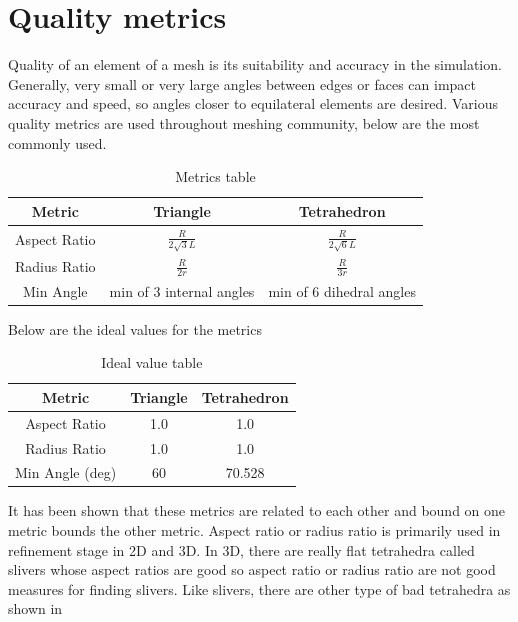 \section{Quality metrics}
Quality of an element of a mesh is its suitability and accuracy in the simulation. Generally, very small or very large angles between edges or faces can impact accuracy and speed, so angles closer to equilateral elements are desired. Various quality metrics are used throughout meshing community, below are the most commonly used.

\begin{table}[ht]
\caption{Metrics table}
\begin{center}
\begin{tabular}{ |c|c|c| } 
\hline
Metric & Triangle & Tetrahedron \\ 
\hline
Aspect Ratio & $\frac{R}{2\sqrt{3}L}$ & $\frac{R}{2\sqrt{6}L}$ \\ 
\hline
Radius Ratio & $\frac{R}{2r}$ & $\frac{R}{3r}$ \\ 
\hline
Min Angle 	 & min of 3 internal angles & min of 6 dihedral angles  \\ 
\hline
\end{tabular}
\end{center}
\end{table}

Below are the ideal values for the metrics

\begin{table}[ht]
\caption{Ideal value table}
\begin{center}
\begin{tabular}{ |c|c|c| } 
\hline
Metric & Triangle & Tetrahedron \\ 
\hline
Aspect Ratio & 1.0 & 1.0 \\ 
\hline
Radius Ratio & 1.0 & 1.0 \\ 
\hline
Min Angle (deg)	& 60 & 70.528  \\ 
\hline
\end{tabular}
\end{center}
\end{table}

It has been shown that these metrics are related to each other and bound on one metric bounds the other metric. Aspect ratio or radius ratio is primarily used in refinement stage in 2D and 3D. In 3D, there are really flat tetrahedra called slivers whose aspect ratios are good so aspect ratio or radius ratio are not good measures for finding slivers. Like slivers, there are other type of bad tetrahedra as shown in 









